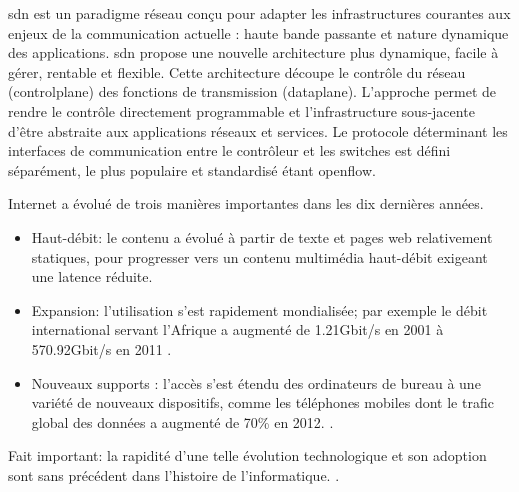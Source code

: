 \gls{sdn} est un \gls{paradigme} réseau conçu pour adapter les infrastructures courantes aux enjeux de la communication actuelle : haute bande passante et nature dynamique des applications. \gls{sdn} propose une nouvelle architecture plus dynamique, facile à gérer, rentable et flexible. Cette architecture découpe le contrôle du réseau (\gls{controlplane}) des fonctions de transmission (\gls{dataplane}). L'approche permet de rendre le contrôle directement programmable et l'infrastructure sous-jacente d'être abstraite aux applications réseaux et services. Le protocole déterminant les interfaces de communication entre le contrôleur et les switches est défini séparément, le plus populaire et standardisé étant \gls{openflow}. \cite{OpenFlowStanford} \cite{ODCAintro} \cite{SDNNewNormONFExecutiveSummary}

Internet a évolué de trois manières importantes dans les dix dernières années. 
\begin{itemize}
\item Haut-débit: le contenu a évolué à partir de texte et pages web relativement statiques, pour progresser vers un contenu multimédia haut-débit exigeant une latence réduite. 
\item Expansion: l'utilisation s'est rapidement mondialisée; par exemple le débit international servant l'Afrique a augmenté de 1.21Gbit/s en 2001 à 570.92Gbit/s en 2011 \cite{InternetGlobalGrowthImpactDevelopingCountries}.
\item  Nouveaux supports : l'accès s'est étendu des ordinateurs de bureau à une variété de nouveaux dispositifs, comme les téléphones mobiles dont le trafic global des données a augmenté de 70\% en 2012. \cite{CiscoVNI2013}. 
\end{itemize}
Fait important: la rapidité d'une telle évolution technologique et son adoption sont sans précédent dans l'histoire de l'informatique. \cite{InternetGlobalGrowthImpactDevelopingCountries}.


